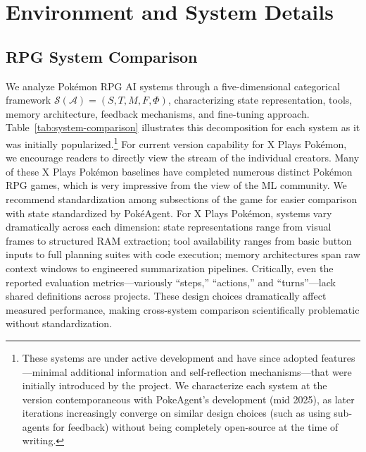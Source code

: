 \section{Environment and System Details}
\label{sec:environment-details}

\subsection{RPG System Comparison}
\label{sec:system-comparison}

We analyze Pokémon RPG AI systems through a five-dimensional categorical framework $\mathcal{S}(\mathcal{A}) = (S, T, M, F, \Phi)$, characterizing state representation, tools, memory architecture, feedback mechanisms, and fine-tuning approach. Table~\ref{tab:system-comparison} illustrates this decomposition for each system as it was initially popularized.\footnote{These systems are under active development and have since adopted features---minimal additional information and self-reflection mechanisms---that were initially introduced by the \pokeagent project. We characterize each system at the version contemporaneous with PokeAgent's development (mid 2025), as later iterations increasingly converge on similar design choices (such as using sub-agents for feedback) without being completely open-source at the time of writing.} For current version capability for X Plays Pokémon, we encourage readers to directly view the stream of the individual creators. Many of these X Plays Pokémon baselines have completed numerous distinct Pokémon RPG games, which is very impressive from the view of the ML community. We recommend standardization among subsections of the game for easier comparison with state standardized by PokéAgent. For X Plays Pokémon, systems vary dramatically across each dimension: state representations range from visual frames to structured RAM extraction; tool availability ranges from basic button inputs to full planning suites with code execution; memory architectures span raw context windows to engineered summarization pipelines. Critically, even the reported evaluation metrics---variously ``steps,'' ``actions,'' and ``turns''---lack shared definitions across projects. These design choices dramatically affect measured performance, making cross-system comparison scientifically problematic without standardization.

